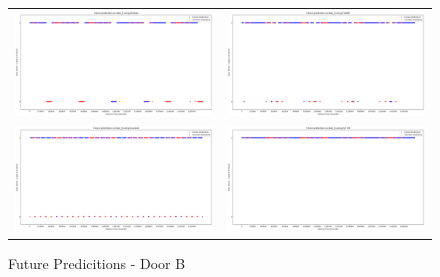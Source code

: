 \begin{figure}
  \begin{tabular}{cc}
    {\includegraphics[width = 3in]{images/results/Future_door_B_Duckett.png}} &
    {\includegraphics[width = 3in]{images/results/Future_door_B_FreMEn.png}} \\
    {\includegraphics[width = 3in]{images/results/Future_door_B_Gaussian.png}} &
    {\includegraphics[width = 3in]{images/results/Future_door_B_HyT-EM.png}} \\
  \end{tabular}
  \caption{Future Predicitions - Door B}
\end{figure}\\ \\

